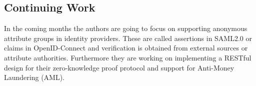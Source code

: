 \subsection{Continuing Work}
In the coming months the authors are going to focus on supporting anonymous attribute groups in identity providers. These are called assertions in SAML2.0 or claims in OpenID-Connect and verification is obtained from external sources or attribute authorities. Furthermore they are working on implementing a RESTful design for their zero-knowledge proof protocol and support for Anti-Money Laundering (AML).\cite[p.17]{hardjono2016anonymous}


